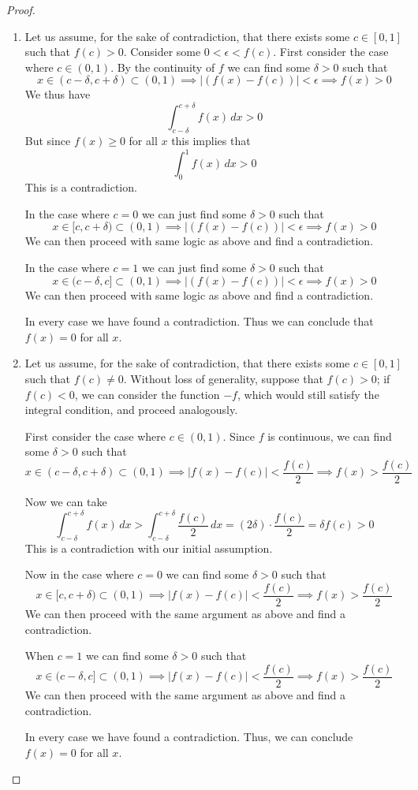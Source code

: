 \documentclass{exam}
\begin{document}
\begin{proof}
  \begin{enumerate} 
    \item Let us assume, for the sake of contradiction, that there
    exists some $c\in [0,1]$ such that $f(c)>0$. Consider some
    $0 <\epsilon < f(c)$. First consider the case where $c\in(0,1)$.
    By the continuity of $f$ we can find some $\delta >0$ such
    that $$x\in (c-\delta, c+\delta)\subset (0,1)\implies 
    |(f(x)-f(c))|< \epsilon \implies f(x) >0$$ We thus have
    $$\int_{c-\delta}^{c+\delta}f(x) \, dx > 0$$ But since 
    $f(x)\geq 0$ for all $x$ this implies that $$\int_0^1 f(x) \, 
    dx >0$$ This is a contradiction. 
    
    In the case where $c=0$ we can just find some $\delta >0$ such
    that $$x\in [c, c+\delta)\subset (0,1)\implies |(f(x)-f(c))|
    < \epsilon \implies f(x) >0$$ We can then proceed with same logic
    as above and find a contradiction.

    In the case where $c=1$ we can just find some $\delta >0$ such
    that $$x\in (c-\delta, c]\subset (0,1)\implies |(f(x)-f(c))|<
    \epsilon \implies f(x) >0$$ We can then proceed with same logic
    as above and find a contradiction.

    In every case we have found a contradiction. Thus we can conclude
    that $f(x) = 0$ for all $x$.

    \item  Let us assume, for the sake of contradiction, that there
    exists some $c\in[0, 1]$ such that $f(c) \neq 0$. Without loss
    of generality, suppose that $f(c) > 0$; if $f(c) < 0$, we can
    consider the function $-f$, which would still satisfy the
    integral condition, and proceed analogously.
    
    First consider the case where $c\in (0,1)$.
    Since $f$ is continuous, we can find some $\delta > 0$ such that
    $$x\in (c-\delta, c+\delta)\subset (0,1)\implies |f(x)-f(c)| 
    <\frac{f(c)}{2} \implies f(x) > \frac{f(c)}{2}$$
      
    Now we can take
    \[
    \int_{c - \delta}^{c + \delta} f(x) \, dx > \int_{c - \delta}
    ^{c + \delta} \dfrac{f(c)}{2} \, dx = (2\delta) \cdot 
    \dfrac{f(c)}{2} = \delta f(c) > 0
    \]
    This is a contradiction with our initial assumption.

    Now in the case where $c=0$ we can find some $\delta>0$ such
    that $$x\in [c, c+\delta)\subset (0,1)\implies |f(x)-f(c)|
    <\frac{f(c)}{2} \implies f(x) > \frac{f(c)}{2}$$
    We can then proceed with the same argument as above and find a
    contradiction.

    When $c=1$ we can find some $\delta>0$ such that $$x\in
    (c-\delta, c]\subset (0,1)\implies |f(x)-f(c)| 
    <\frac{f(c)}{2} \implies f(x) > \frac{f(c)}{2}$$
    We can then proceed with the same argument as above and find a
    contradiction.

    In every case we have found a contradiction. Thus, we can
    conclude $f(x) = 0$ for all $x$.
  \end{enumerate}
\end{proof}
\end{document}
